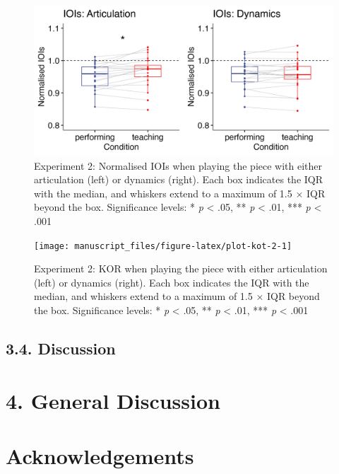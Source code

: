 \documentclass[
  english,
  man,floatsintext]{apa6}
\begin{document}
\begin{figure}
\includegraphics[width=1\linewidth]{manuscript_files/figure-latex/plot-ioi-2-1} \caption{\label{fig:ioi-2}Experiment 2: Normalised IOIs when playing the piece with either articulation (left) or dynamics (right). Each box indicates the IQR with the median, and whiskers extend to a maximum of 1.5 × IQR beyond the box. Significance levels: * \textit{p} < .05, ** \textit{p} < .01, *** \textit{p} < .001}\label{fig:plot-ioi-2}
\end{figure}

\begin{figure}
\texttt{[image: manuscript\_files/figure-latex/plot-kot-2-1]} \caption{\label{fig:kot-2}Experiment 2: KOR when playing the piece with either articulation (left) or dynamics (right). Each box indicates the IQR with the median, and whiskers extend to a maximum of 1.5 × IQR beyond the box. Significance levels: * \textit{p} < .05, ** \textit{p} < .01, *** \textit{p} < .001}\label{fig:plot-kot-2}
\end{figure}

\hypertarget{discussion-1}{%
\subsection{3.4. Discussion}\label{discussion-1}}

\newpage

\hypertarget{general-discussion}{%
\section{4. General Discussion}\label{general-discussion}}

\hypertarget{acknowledgements}{%
\section{Acknowledgements}\label{acknowledgements}}
\end{document}
